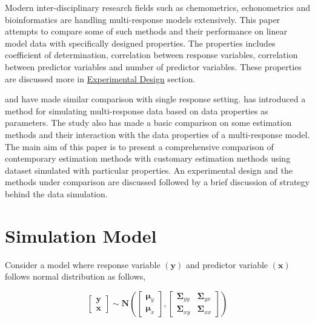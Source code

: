 \documentclass[12pt,3p,authoryear]{elsarticle}
\begin{document}
Modern inter-disciplinary research fields such as chemometrics,
echonometrics and bioinformatics are handling multi-response models
extensively. This paper attempts to compare some of such methods and
their performance on linear model data with specifically designed
properties. The properties includes coefficient of determination,
correlation between response variables, correlation between predictor
variables and number of predictor variables. These properties are
discussed more in \protect\hyperlink{experimental-design}{Experimental
Design} section.

\citet{saebo2015simrel} and \citet{Alm_y_1996} have made similar
comparison with single response setting. \citet{Rimal_2018} has
introduced a method for simulating multi-response data based on data
properties as parameters. The study also has made a basic comparison on
some estimation methods and their interaction with the data properties
of a multi-response model. The main aim of this paper is to present a
comprehensive comparison of contemporary estimation methods with
customary estimation methods using dataset simulated with particular
properties. An experimental design and the methods under comparison are
discussed followed by a brief discussion of strategy behind the data
simulation.

\section{Simulation Model}\label{simulation-model}

Consider a model where response variable \((\mathbf{y})\) and predictor
variable \((\mathbf{x})\) follows normal distribution as follows,

\begin{equation}
  \begin{bmatrix}
    \mathbf{y} \\ \mathbf{x}
  \end{bmatrix} \sim \mathbf{N}
  \left(
    \begin{bmatrix}
      \boldsymbol{\mu}_y \\
      \boldsymbol{\mu}_x
    \end{bmatrix},
    \begin{bmatrix}
    \boldsymbol{\Sigma}_{yy} & \boldsymbol{\Sigma}_{yx} \\
    \boldsymbol{\Sigma}_{xy} & \boldsymbol{\Sigma}_{xx}
    \end{bmatrix}
  \right)
  \label{eq:model-1}
\end{equation}
\end{document}
